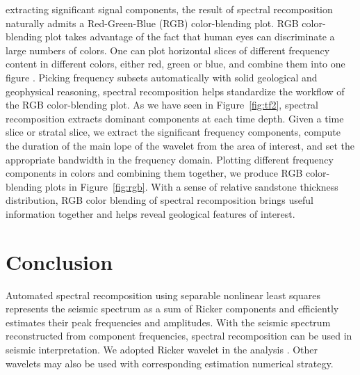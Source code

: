  extracting significant signal components, the result of spectral recomposition naturally admits a Red-Green-Blue (RGB) color-blending plot. RGB color-blending plot takes advantage of the fact that human eyes can discriminate a large numbers of colors. One can plot horizontal slices of different frequency content in different colors, either red, green or blue, and combine them into one figure \cite[]{Chopra}.  Picking frequency subsets automatically with solid geological and geophysical reasoning, spectral recomposition helps standardize the workflow of the RGB color-blending plot. As we have seen in Figure~\ref{fig:tf2}, spectral recomposition extracts dominant components at each time depth. Given a time slice or stratal slice, we extract the significant frequency components, compute the duration of the main lope of the wavelet from the area of interest, and set the appropriate bandwidth in the frequency domain. Plotting  different frequency components in   colors and combining them together, we produce RGB color-blending plots in Figure~\ref{fig:rgb}. With a sense of relative sandstone thickness distribution, RGB color blending of spectral recomposition brings  useful information together and helps reveal geological features of interest.



\section{Conclusion}
Automated spectral recomposition using separable nonlinear least squares represents the seismic spectrum as a sum of Ricker components and efficiently estimates their peak frequencies and amplitudes. With the seismic spectrum reconstructed from component frequencies, spectral recomposition can be used in seismic interpretation. We adopted Ricker wavelet in the analysis . Other wavelets may also be used with corresponding estimation numerical strategy.

